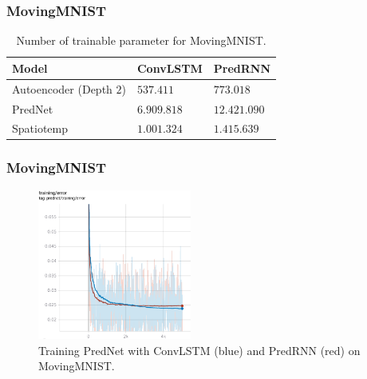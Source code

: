   \begin{frame}
   \frametitle{MovingMNIST}
   
   \begin{table}[H]
    \begin{center}
     \begin{tabular}{| l | l | l |}\hline
      \textbf{Model} & \textbf{ConvLSTM} & \textbf{PredRNN} \\\hline
      Autoencoder (Depth $2$) & $537.411$ & $773.018$ \\\hline
      PredNet & $6.909.818$ & $12.421.090$ \\\hline
      Spatiotemp & $1.001.324$ & $1.415.639$ \\\hline
     \end{tabular}
    \end{center}
    \caption{Number of trainable parameter for MovingMNIST.}
   \end{table}
   
  \end{frame}
  \begin{frame}
   \frametitle{MovingMNIST}
   
   \begin{figure}[H]
    \includegraphics[width=0.45\textwidth]{../Images/prednet_mnist_training.png}
    \centering
    \caption{Training PredNet with ConvLSTM (blue) and PredRNN (red) on MovingMNIST.}
    \label{fig:prednet_mnist_training}
   \end{figure}
   
  \end{frame}
